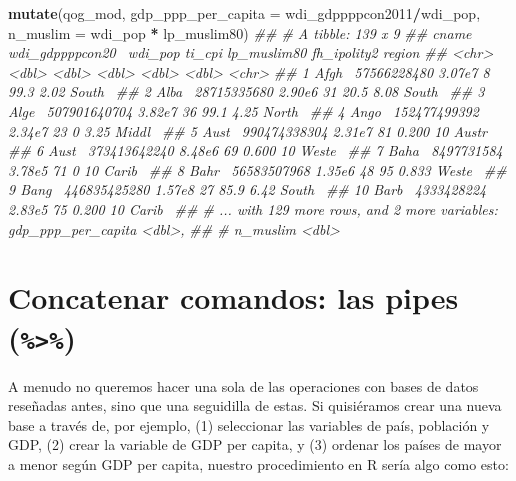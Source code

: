 \documentclass[]{book}
\newenvironment{Shaded}{\begin{snugshade}}{\end{snugshade}}
\newcommand{\CommentTok}[1]{\textcolor[rgb]{0.56,0.35,0.01}{\textit{#1}}}
\newcommand{\DataTypeTok}[1]{\textcolor[rgb]{0.13,0.29,0.53}{#1}}
\newcommand{\KeywordTok}[1]{\textcolor[rgb]{0.13,0.29,0.53}{\textbf{#1}}}
\newcommand{\NormalTok}[1]{#1}
\newcommand{\OperatorTok}[1]{\textcolor[rgb]{0.81,0.36,0.00}{\textbf{#1}}}
\newcommand{\StringTok}[1]{\textcolor[rgb]{0.31,0.60,0.02}{#1}}
\begin{document}
\begin{Shaded}
\begin{Highlighting}[]
\KeywordTok{mutate}\NormalTok{(qog_mod, }
       \DataTypeTok{gdp_ppp_per_capita =}\NormalTok{ wdi_gdppppcon2011}\OperatorTok{/}\NormalTok{wdi_pop,}
       \DataTypeTok{n_muslim           =}\NormalTok{ wdi_pop }\OperatorTok{*}\StringTok{ }\NormalTok{lp_muslim80)}
\CommentTok{## # A tibble: 139 x 9}
\CommentTok{##    cname wdi_gdppppcon20~ wdi_pop ti_cpi lp_muslim80 fh_ipolity2 region}
\CommentTok{##    <chr>            <dbl>   <dbl>  <dbl>       <dbl>       <dbl> <chr> }
\CommentTok{##  1 Afgh~      57566228480  3.07e7      8      99.3         2.02  South~}
\CommentTok{##  2 Alba~      28715335680  2.90e6     31      20.5         8.08  South~}
\CommentTok{##  3 Alge~     507901640704  3.82e7     36      99.1         4.25  North~}
\CommentTok{##  4 Ango~     152477499392  2.34e7     23       0           3.25  Middl~}
\CommentTok{##  5 Aust~     990474338304  2.31e7     81       0.200      10     Austr~}
\CommentTok{##  6 Aust~     373413642240  8.48e6     69       0.600      10     Weste~}
\CommentTok{##  7 Baha~       8497731584  3.78e5     71       0          10     Carib~}
\CommentTok{##  8 Bahr~      56583507968  1.35e6     48      95           0.833 Weste~}
\CommentTok{##  9 Bang~     446835425280  1.57e8     27      85.9         6.42  South~}
\CommentTok{## 10 Barb~       4333428224  2.83e5     75       0.200      10     Carib~}
\CommentTok{## # ... with 129 more rows, and 2 more variables: gdp_ppp_per_capita <dbl>,}
\CommentTok{## #   n_muslim <dbl>}
\end{Highlighting}
\end{Shaded}

\hypertarget{concatenar-comandos-las-pipes}{%
\section{\texorpdfstring{Concatenar comandos: las pipes
(\texttt{\%\textgreater{}\%})}{Concatenar comandos: las pipes (\%\textgreater{}\%)}}\label{concatenar-comandos-las-pipes}}

A menudo no queremos hacer una sola de las operaciones con bases de
datos reseñadas antes, sino que una seguidilla de estas. Si quisiéramos
crear una nueva base a través de, por ejemplo, (1) seleccionar las
variables de país, población y GDP, (2) crear la variable de GDP per
capita, y (3) ordenar los países de mayor a menor según GDP per capita,
nuestro procedimiento en R sería algo como esto:
\end{document}
